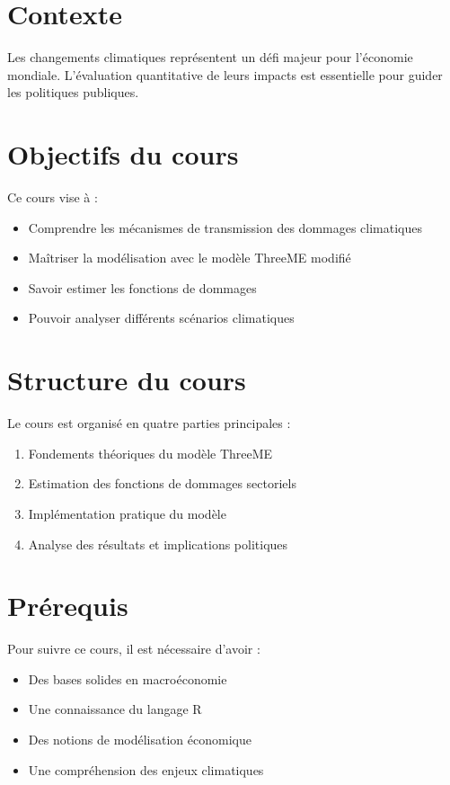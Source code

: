 \section{Contexte}
Les changements climatiques représentent un défi majeur pour l'économie mondiale. L'évaluation quantitative de leurs impacts est essentielle pour guider les politiques publiques.

\section{Objectifs du cours}
Ce cours vise à :
\begin{itemize}
    \item Comprendre les mécanismes de transmission des dommages climatiques
    \item Maîtriser la modélisation avec le modèle ThreeME modifié
    \item Savoir estimer les fonctions de dommages
    \item Pouvoir analyser différents scénarios climatiques
\end{itemize}

\section{Structure du cours}
Le cours est organisé en quatre parties principales :
\begin{enumerate}
    \item Fondements théoriques du modèle ThreeME
    \item Estimation des fonctions de dommages sectoriels
    \item Implémentation pratique du modèle
    \item Analyse des résultats et implications politiques
\end{enumerate}

\section{Prérequis}
Pour suivre ce cours, il est nécessaire d'avoir :
\begin{itemize}
    \item Des bases solides en macroéconomie
    \item Une connaissance du langage R
    \item Des notions de modélisation économique
    \item Une compréhension des enjeux climatiques
\end{itemize}
